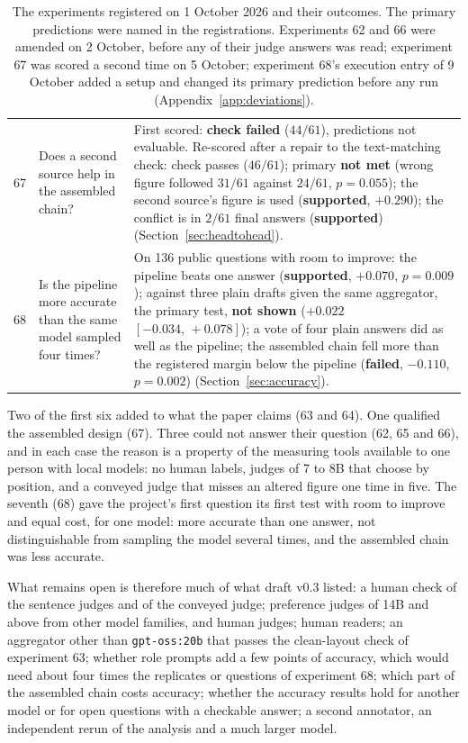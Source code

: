 \documentclass[10pt,twocolumn]{article}
\newcommand{\ci}[2]{\ensuremath{[#1,\,#2]}}
\begin{document}
\begin{table}[t]
\begin{tabular}{lp{}p{}}
67 & Does a second source help in the assembled chain? & First scored: \textbf{check failed} ($44/61$), predictions not evaluable. Re-scored after a repair to the text-matching check: check passes ($46/61$); primary \textbf{not met} (wrong figure followed $31/61$ against $24/61$, $p=0.055$); the second source's figure is used (\textbf{supported}, $+0.290$); the conflict is in $2/61$ final answers (\textbf{supported}) (Section~\ref{sec:headtohead}). \\
68 & Is the pipeline more accurate than the same model sampled four times? & On 136 public questions with room to improve: the pipeline beats one answer (\textbf{supported}, $+0.070$, $p=0.009$); against three plain drafts given the same aggregator, the primary test, \textbf{not shown} ($+0.022$ \ci{-0.034}{+0.078}); a vote of four plain answers did as well as the pipeline; the assembled chain fell more than the registered margin below the pipeline (\textbf{failed}, $-0.110$, $p=0.002$) (Section~\ref{sec:accuracy}). \\
\bottomrule
\end{tabular}
\caption{The experiments registered on 1 October 2026 and their
outcomes. The primary predictions were named in the registrations.
Experiments 62 and 66 were amended on 2 October, before any of their
judge answers was read; experiment 67 was scored a second time on 5
October; experiment 68's execution entry of 9 October added a setup and
changed its primary prediction before any run
(Appendix~\ref{app:deviations}).}
\label{tab:planned}
\end{table}

Two of the first six added to what the paper claims (63 and 64). One
qualified the assembled design (67). Three could not answer their
question (62, 65 and 66), and in each case the reason is a property of
the measuring tools available to one person with local models: no human
labels, judges of 7 to 8B that choose by position, and a conveyed judge
that misses an altered figure one time in five. The seventh (68) gave
the project's first question its first test with room to improve and
equal cost, for one model: more accurate than one answer, not
distinguishable from sampling the model several times, and the
assembled chain was less accurate.

What remains open is therefore much of what draft v0.3 listed: a human
check of the sentence judges and of the conveyed judge; preference
judges of 14B and above from other model families, and human judges;
human readers; an aggregator other than \texttt{gpt-oss:20b} that
passes the clean-layout check of experiment 63; whether role prompts
add a few points of accuracy, which would need about four times the
replicates or questions of experiment 68; which part of the assembled
chain costs accuracy; whether the accuracy results hold for another
model or for open questions with a checkable answer; a second
annotator, an independent rerun of the analysis and a much larger
model.
\end{document}
